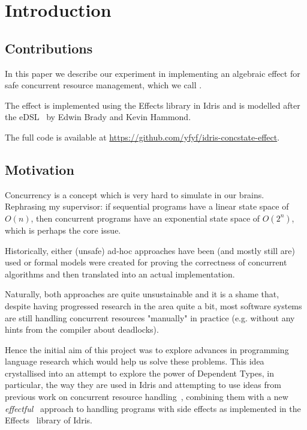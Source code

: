 \section{Introduction}

\subsection{Contributions}

In this paper we describe our experiment in implementing an algebraic effect
for safe concurrent resource management, which we call .

The effect is implemented using the Effects library in Idris and is modelled
after the  eDSL~\cite{cbconc-fi} by Edwin Brady and Kevin
Hammond.

The full code is available at
\url{https://github.com/yfyf/idris-concstate-effect}.

\subsection{Motivation}

Concurrency is a concept which is very hard to simulate in our brains.
Rephrasing my supervisor: if sequential programs have a linear state space of
$O(n)$, then concurrent programs have an exponential state space of $O(2^n)$,
which is perhaps the core issue.

Historically, either (unsafe) ad-hoc approaches have been (and mostly still
are) used or formal models were created for proving the correctness of
concurrent algorithms and then translated into an actual implementation.

Naturally, both approaches are quite unsustainable and it is a shame that,
despite having progressed research in the area quite a bit, most software
systems are still handling concurrent resources "manually" in practice (e.g.
without any hints from the compiler about deadlocks).

Hence the initial aim of this project was to explore advances in programming
language research which would help us solve these problems. This idea
crystallised into an attempt to explore the power of Dependent Types, in
particular, the way they are used in Idris and attempting to use ideas from
previous work on concurrent resource handling~\cite{cbconc-fi}, combining them
with a new \emph{effectful}~\cite{eff} approach to handling programs with side
effects as implemented in the Effects~\cite{effects-idr} library of Idris.

